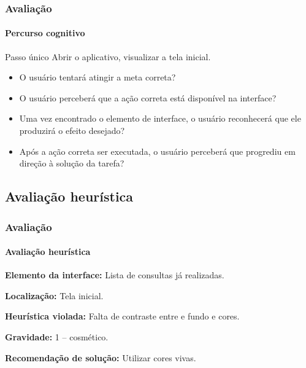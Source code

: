 \documentclass[14pt,beamer]{beamer}
\begin{document}
\begin{frame}
	\frametitle{Avaliação}
	\framesubtitle{Percurso cognitivo}

    \begin{block}{Passo único}
        Abrir o aplicativo, visualizar a tela inicial.
    \end{block}
    \begin{itemize}
        \item O usuário tentará atingir a meta correta?
        \item O usuário perceberá que a ação correta está disponível na interface?
        \item Uma vez encontrado o elemento de interface, o usuário reconhecerá que ele produzirá o 
efeito desejado?
        \item Após a ação correta ser executada, o usuário perceberá que progrediu em direção à solução 
da tarefa?
    \end{itemize}
\end{frame}

\subsection{Avaliação heurística}
\begin{frame}
	\frametitle{Avaliação}
	\framesubtitle{Avaliação heurística}
    
\par \noindent \textbf{Elemento da interface:} Lista de consultas já realizadas.
\par \noindent \textbf{Localização:} Tela inicial.
\par \noindent \textbf{Heurística violada:} Falta de contraste entre e fundo e cores.
\par \noindent \textbf{Gravidade:} 1 -- cosmético.
\par \noindent \textbf{Recomendação de solução:} Utilizar cores vivas.
\end{frame}
\end{document}
